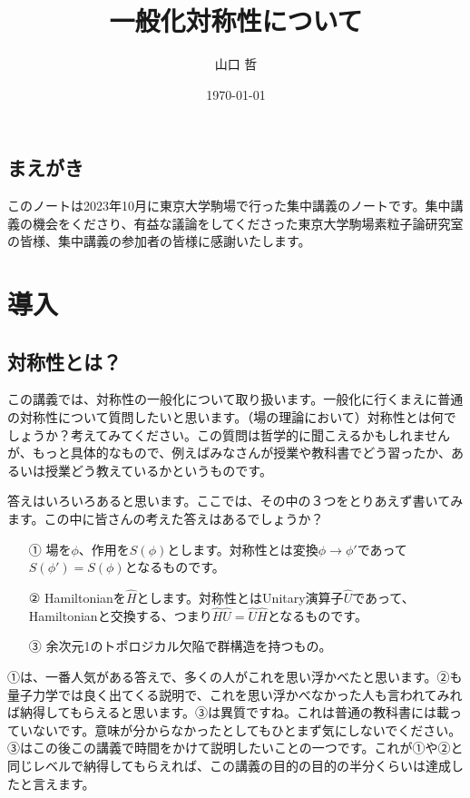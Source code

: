 \documentclass[report,paper=a4, fontsize=12pt, line_length=16cm, number_of_lines=33,dvipdfmx]{jlreq}
\title{一般化対称性について}
\author{山口 哲}
\date{\today}
\newcommand{\preface}[1]{\section*{#1}}
\numberwithin{equation}{chapter}
\newcommand{\Hh}{\widehat{H}}
\newcommand{\Uh}{\widehat{U}}
\begin{document}
\maketitle
\tableofcontents

\preface{まえがき}

このノートは2023年10月に東京大学駒場で行った集中講義のノートです。集中講義の機会をくださり、有益な議論をしてくださった東京大学駒場素粒子論研究室の皆様、集中講義の参加者の皆様に感謝いたします。

\chapter{導入}
\section{対称性とは？}

この講義では、対称性の一般化について取り扱います。一般化に行くまえに普通の対称性について質問したいと思います。（場の理論において）対称性とは何でしょうか？考えてみてください。この質問は哲学的に聞こえるかもしれませんが、もっと具体的なもので、例えばみなさんが授業や教科書でどう習ったか、あるいは授業どう教えているかというものです。

答えはいろいろあると思います。ここでは、その中の３つをとりあえず書いてみます。この中に皆さんの考えた答えはあるでしょうか？
\begin{itemize}
  \item[①] 場を$\phi$、作用を$S(\phi)$とします。対称性とは変換$\phi\to\phi'$であって$S(\phi')=S(\phi)$となるものです。
  \item[②] Hamiltonianを$\Hh$とします。対称性とはUnitary演算子$\Uh$であって、Hamiltonianと交換する、つまり$\Hh \Uh =\Uh \Hh$となるものです。
  \item[③] 余次元1のトポロジカル欠陥で群構造を持つもの。  
\end{itemize}
①は、一番人気がある答えで、多くの人がこれを思い浮かべたと思います。②も量子力学では良く出てくる説明で、これを思い浮かべなかった人も言われてみれば納得してもらえると思います。③は異質ですね。これは普通の教科書には載っていないです。意味が分からなかったとしてもひとまず気にしないでください。③はこの後この講義で時間をかけて説明したいことの一つです。これが①や②と同じレベルで納得してもらえれば、この講義の目的の目的の半分くらいは達成したと言えます。
\end{document}

